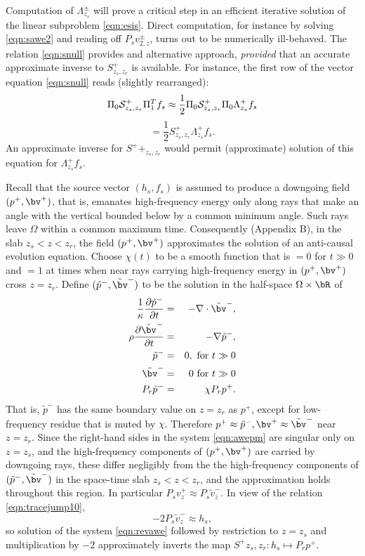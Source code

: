 Computation of $\Lambda^{\pm}_{z_s}$ will prove a critical step in an
efficient iterative solution of the linear subproblem
\ref{eqn:esis}. Direct computation, for instance by solving
\ref{eqn:sawe2} and reading off $P_sv^{\pm}_{2,z}$, turns out to be
numerically ill-behaved. The relation \ref{eqn:snull} provides and
alternative approach, {\em provided} that an accurate approximate
inverse to $S^+_{z_s,z_r}$ is available. For instance, the first row
of the vector equation \ref{eqn:snull} reads (slightly rearranged):
\[
\Pi_0{\cal S}^+_{z_s,z_r}\Pi_1^T f_s \approx \frac{1}{2}\Pi_0{\cal
  S}^+_{z_s,z_r}\Pi_0\Lambda^+_{z_s}f_s
\]
\begin{equation}
  \label{eqn:lamidea}
  = \frac{1}{2} S^+_{z_s,z_r}\Lambda^+_{z_s}f_s.
\end{equation}
An approximate inverse for $S^++_{z_s,z_r}$ would permit (approximate)
solution of this equation for $\Lambda^+_{z_s}f_s$.

Recall that the source vector $(h_s,f_s)$ is assumed to produce a
downgoing field $(p^+,\bv^+)$, that is, emanates high-frequency energy only along
rays that make an angle with the vertical bounded below by a common
minimum angle. Such rays leave $\Omega$ within a common maximum
time. Consequently (Appendix B), in the
slab $z_s<z<z_r$, the field $(p^+,\bv^+)$ approximates the solution of an
anti-causal evolution equation. Choose $\chi(t)$ to be a smooth function
that is $= 0$ for $t \gg 0$ and $=1$ at times when near rays carrying
high-frequency energy in $(p^+,\bv^+)$ cross $z=z_r$. Define 
$(\tilde{p}^-,\tilde{\bv}^-)$ to be the solution in the half-space
$\Omega \times \bR$ of
\begin{eqnarray}
\label{eqn:revawe}
  \frac{1}{\kappa}\frac{\partial \tilde{p}^-}{\partial t} & = & - \nabla \cdot \tilde{\bv}^-, \nonumber \\
  \rho\frac{\partial \tilde{\bv}^-}{\partial t} & = & - \nabla \tilde{p}^-,\nonumber \\
  \tilde{p}^- & =& 0,  \mbox{ for } t \gg 0\\ 
  \tilde{\bv}^- & = & 0 \mbox{ for } t \gg 0\\
  P_r\tilde{p}^- &=& \chi P_rp^+ . 
\end{eqnarray}
That is, $\tilde{p}^-$ has the same boundary value on $z=z_r$ as
$p^+$, except for low-frequency residue that is muted by
$\chi$. Therefore
$p^+ \approx \tilde{p}^-, \bv^+ \approx \tilde{\bv}^-$ near
$z=z_r$. Since the right-hand sides in the system \ref{eqn:awepm} are
singular only on $z=z_s$, and the high-frequency components of
$(p^+,\bv^+)$ are carried by downgoing rays, these differ negligibly
from the the high-frequency components of
$(\tilde{p}^-,\tilde{\bv}^-)$ in the space-time slab $z_s<z<z_r$, and
the approximation holds throughout this region. In particular
$P_sv^+_z \approx P_s \tilde{v}^-_z$. In view of the relation
\ref{eqn:tracejump10},
\begin{equation}
  \label{eqn:tildevtohsubs}
  -2P_s\tilde{v}^-_z \approx h_s,
\end{equation}
so solution
of the system \ref{eqn:revawe} followed by restriction to $z=z_s$ and
multiplication by $-2$ 
approximately inverts the map $S^+{z_s,z_r}: h_s \mapsto P_rp^+$.

